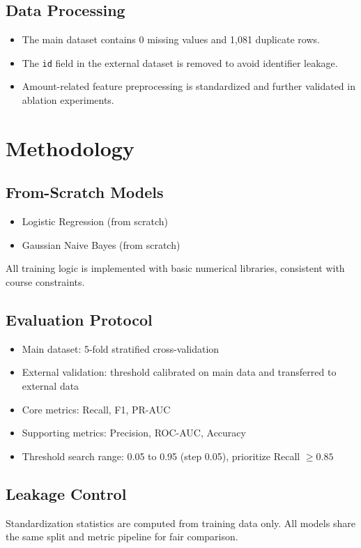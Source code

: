 \documentclass[12pt,a4paper]{article}
\begin{document}
\subsection{Data Processing}
\begin{itemize}
  \item The main dataset contains 0 missing values and 1{,}081 duplicate rows.
  \item The \texttt{id} field in the external dataset is removed to avoid identifier leakage.
  \item Amount-related feature preprocessing is standardized and further validated in ablation experiments.
\end{itemize}

\section{Methodology}
\subsection{From-Scratch Models}
\begin{itemize}
  \item Logistic Regression (from scratch)
  \item Gaussian Naive Bayes (from scratch)
\end{itemize}
All training logic is implemented with basic numerical libraries, consistent with course constraints.

\subsection{Evaluation Protocol}
\begin{itemize}
  \item Main dataset: 5-fold stratified cross-validation
  \item External validation: threshold calibrated on main data and transferred to external data
  \item Core metrics: Recall, F1, PR-AUC
  \item Supporting metrics: Precision, ROC-AUC, Accuracy
  \item Threshold search range: 0.05 to 0.95 (step 0.05), prioritize Recall $\ge 0.85$
\end{itemize}

\subsection{Leakage Control}
Standardization statistics are computed from training data only. All models share the same split and metric pipeline for fair comparison.
\end{document}
